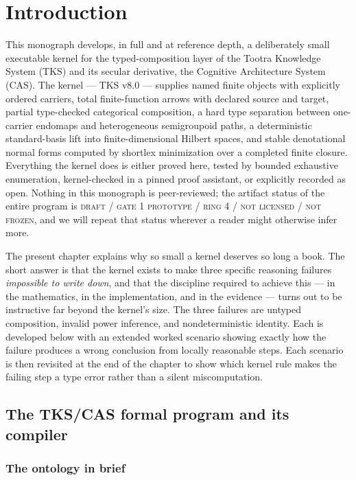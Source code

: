 \chapter{Introduction}\label{ch01:chap}

This monograph develops, in full and at reference depth, a deliberately small
executable kernel for the typed-composition layer of the Tootra Knowledge
System (TKS) and its secular derivative, the Cognitive Architecture System
(CAS). The kernel --- TKS v8.0 --- supplies named finite objects with
explicitly ordered carriers, total finite-function arrows with declared source
and target, partial type-checked categorical composition, a hard type
separation between one-carrier endomaps and heterogeneous semigroupoid paths, a
deterministic standard-basis lift into finite-dimensional Hilbert spaces, and
stable denotational normal forms computed by shortlex minimization over a
completed finite closure. Everything the kernel does is either proved here,
tested by bounded exhaustive enumeration, kernel-checked in a pinned proof
assistant, or explicitly recorded as open. Nothing in this monograph is
peer-reviewed; the artifact status of the entire program is \textsc{draft /
gate 1 prototype / ring 4 / not licensed / not frozen}, and we will repeat that
status wherever a reader might otherwise infer more.

The present chapter explains why so small a kernel deserves so long a book.
The short answer is that the kernel exists to make three specific reasoning
failures \emph{impossible to write down}, and that the discipline required to
achieve this --- in the mathematics, in the implementation, and in the evidence
--- turns out to be instructive far beyond the kernel's size. The three
failures are untyped composition, invalid power inference, and nondeterministic
identity. Each is developed below with an extended worked scenario showing
exactly how the failure produces a wrong conclusion from locally reasonable
steps. Each scenario is then revisited at the end of the chapter to show which
kernel rule makes the failing step a type error rather than a silent
miscomputation.

\section{The TKS/CAS formal program and its compiler}\label{ch01:sec:program}

\subsection{The ontology in brief}


